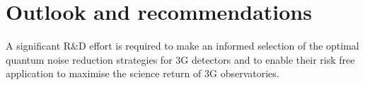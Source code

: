 
\section{Outlook and recommendations}
A significant R\&D effort is required to make an informed selection of the optimal quantum noise reduction strategies for 3G detectors and to enable their risk free application to maximise the science return of 3G 
 observatories. 


